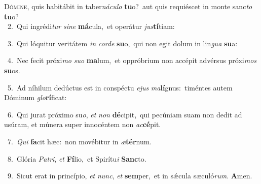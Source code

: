 \lettrine{\initial\textcolor{\initialcolor}{D}}{ómine,} quis habitábit in taber\-\textit{ná}\-\textit{cu}\textit{lo} \textbf{tu}\-o?~\star aut quis requiéscet in monte sanc\textit{to} \textbf{tu}\-o?\\
{\numbfont\textcolor{\numbcolor}{~2.}}~Qui ingrédi\textit{tur} \textit{si}\-\textit{ne} \textbf{má}\-cula,~\star et operátur \textit{jus}\-\textbf{tí}tiam:\par
{\numbfont\textcolor{\numbcolor}{~3.}}~Qui lóquitur veritátem \textit{in} \textit{cor}\-\textit{de} \textbf{su}\-o,~\star qui non egit dolum in lin\textit{gua} \textbf{su}\-a:\par
{\numbfont\textcolor{\numbcolor}{~4.}}~Nec fecit próxi\textit{mo} \textit{su}\-\textit{o} \textbf{ma}\-lum,~\star et oppróbrium non accépit advérsus próxi\textit{mos} \textbf{su}\-os.\par
{\numbfont\textcolor{\numbcolor}{~5.}}~Ad níhilum dedúctus est in conspéctu \textit{e}\-\textit{jus} \textit{ma}\-\textbf{lí}gnus:~\star timéntes autem Dóminum \textit{glo}\-\textbf{rí}ficat:\par
{\numbfont\textcolor{\numbcolor}{~6.}}~Qui jurat próximo su\-\textit{o}\-, \textit{et} \textit{non} \textbf{dé}\-cipit,~\star qui pecúniam suam non dedit ad usúram, et múnera super innocéntem non \textit{ac}\-\textbf{cé}pit.\par
{\numbfont\textcolor{\numbcolor}{~7.}}~\textit{Qui} \textbf{fa}\-cit hæc:~\star non movébitur in \textit{æ}\-\textbf{tér}num.\par
{\numbfont\textcolor{\numbcolor}{~8.}}~Glória \textit{Pa}\-\textit{tri}, \textit{et} \textbf{Fí}\-lio,~\star et Spirítu\textit{i} \textbf{Sanc}\-to.\par
{\numbfont\textcolor{\numbcolor}{~9.}}~Sicut erat in princípio, \textit{et} \textit{nunc}\-, \textit{et} \textbf{sem}\-per,~\star et in sǽcula sæculó\-\textit{rum}\-. \textbf{A}\-men.\par
